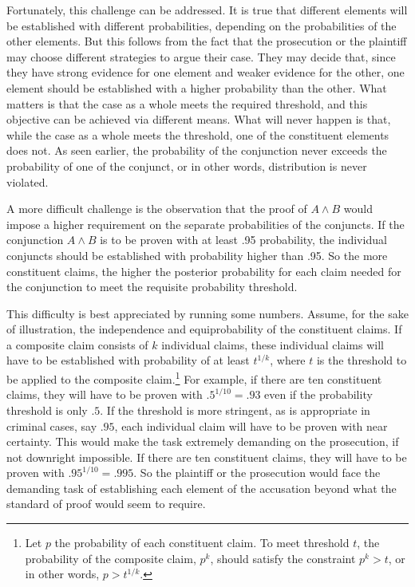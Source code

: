 \documentclass[
  10pt,
  dvipsnames,enabledeprecatedfontcommands]{scrartcl}
\newcommand{\et}{\wedge}
\begin{document}
Fortunately, this challenge can be addressed. It is true that different
elements will be established with different probabilities, depending on
the probabilities of the other elements. But this follows from the fact
that the prosecution or the plaintiff may choose different strategies to
argue their case. They may decide that, since they have strong evidence
for one element and weaker evidence for the other, one element should be
established with a higher probability than the other. What matters is
that the case as a whole meets the required threshold, and this
objective can be achieved via different means. What will never happen is
that, while the case as a whole meets the threshold, one of the
constituent elements does not. As seen earlier, the probability of the
conjunction never exceeds the probability of one of the conjunct, or in
other words, distribution is never violated.

A more difficult challenge is the observation that the proof of
\(A\et B\) would impose a higher requirement on the separate
probabilities of the conjuncts. If the conjunction \(A\et B\) is to be
proven with at least .95 probability, the individual conjuncts should be
established with probability higher than .95. So the more constituent
claims, the higher the posterior probability for each claim needed for
the conjunction to meet the requisite probability threshold.

This difficulty is best appreciated by running some numbers. Assume, for
the sake of illustration, the independence and equiprobability of the
constituent claims. If a composite claim consists of \(k\) individual
claims, these individual claims will have to be established with
probability of at least \(t^{1/k}\), where \(t\) is the threshold to be
applied to the composite
claim.\footnote{Let $p$ the probability of each constituent claim. To meet threshold $t$, the probability of the composite claim, $p^k$, should satisfy the constraint $p^k>t$, or in other words, $p>t^{1/k}$.}
For example, if there are ten constituent claims, they will have to be
proven with \(.5^{1/10}=.93\) even if the probability threshold is only
\(.5\). If the threshold is more stringent, as is appropriate in
criminal cases, say \(.95\), each individual claim will have to be
proven with near certainty. This would make the task extremely demanding
on the prosecution, if not downright impossible. If there are ten
constituent claims, they will have to be proven with
\(.95^{1/10}=.995\). So the plaintiff or the prosecution would face the
demanding task of establishing each element of the accusation beyond
what the standard of proof would seem to require.
\end{document}
